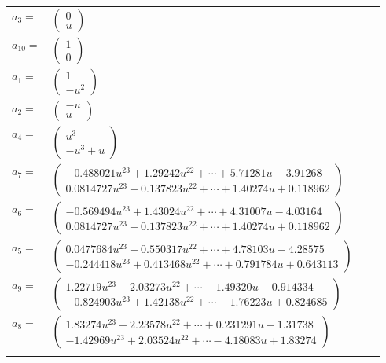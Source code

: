 \documentclass[1p]{elsarticle_modified}
\theoremstyle{definition}
\begin{document}
\begin{tabular}{m{7pt} m{180pt} m{7pt} m{180pt} }
\flushright $a_{3}=$&$\begin{pmatrix}0\\u\end{pmatrix}$ \\
\flushright $a_{10}=$&$\begin{pmatrix}1\\0\end{pmatrix}$ \\
\flushright $a_{1}=$&$\begin{pmatrix}1\\- u^2\end{pmatrix}$ \\
\flushright $a_{2}=$&$\begin{pmatrix}- u\\u\end{pmatrix}$ \\
\flushright $a_{4}=$&$\begin{pmatrix}u^3\\- u^3+u\end{pmatrix}$ \\
\flushright $a_{7}=$&$\begin{pmatrix}-0.488021 u^{23}+1.29242 u^{22}+\cdots+5.71281 u-3.91268\\0.0814727 u^{23}-0.137823 u^{22}+\cdots+1.40274 u+0.118962\end{pmatrix}$ \\
\flushright $a_{6}=$&$\begin{pmatrix}-0.569494 u^{23}+1.43024 u^{22}+\cdots+4.31007 u-4.03164\\0.0814727 u^{23}-0.137823 u^{22}+\cdots+1.40274 u+0.118962\end{pmatrix}$ \\
\flushright $a_{5}=$&$\begin{pmatrix}0.0477684 u^{23}+0.550317 u^{22}+\cdots+4.78103 u-4.28575\\-0.244418 u^{23}+0.413468 u^{22}+\cdots+0.791784 u+0.643113\end{pmatrix}$ \\
\flushright $a_{9}=$&$\begin{pmatrix}1.22719 u^{23}-2.03273 u^{22}+\cdots-1.49320 u-0.914334\\-0.824903 u^{23}+1.42138 u^{22}+\cdots-1.76223 u+0.824685\end{pmatrix}$ \\
\flushright $a_{8}=$&$\begin{pmatrix}1.83274 u^{23}-2.23578 u^{22}+\cdots+0.231291 u-1.31738\\-1.42969 u^{23}+2.03524 u^{22}+\cdots-4.18083 u+1.83274\end{pmatrix}$\\&\end{tabular}
\end{document}
